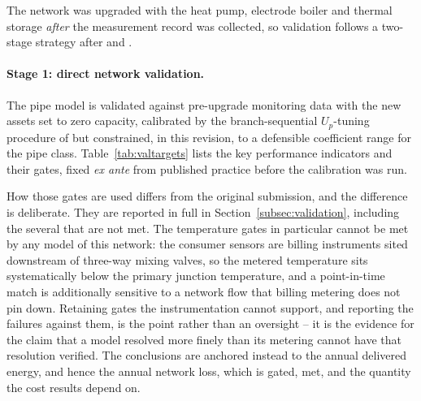 
The network was upgraded with the heat pump, electrode boiler and thermal storage
\emph{after} the measurement record was collected, so validation follows a two-stage
strategy after \citet{Kus2025} and \citet{Maldonado2024}.

\paragraph{Stage 1: direct network validation.}
The pipe model is validated against pre-upgrade monitoring data with the new assets set to
zero capacity, calibrated by the branch-sequential $U_p$-tuning procedure of
\citet{Maldonado2024} but constrained, in this revision, to a defensible coefficient range
for the pipe class. Table~\ref{tab:valtargets} lists the key performance indicators and
their gates, fixed \emph{ex ante} from published practice before the calibration was run.

How those gates are used differs from the original submission, and the difference is
deliberate. They are reported in full in Section~\ref{subsec:validation}, including the
several that are not met. The temperature gates in particular cannot be met by any model of
this network: the consumer sensors are billing instruments sited downstream of three-way
mixing valves, so the metered temperature sits systematically below the primary junction
temperature, and a point-in-time match is additionally sensitive to a network flow that
billing metering does not pin down. Retaining gates the instrumentation cannot support, and
reporting the failures against them, is the point rather than an oversight -- it is the
evidence for the claim that a model resolved more finely than its metering cannot have that
resolution verified. The conclusions are anchored instead to the annual delivered energy,
and hence the annual network loss, which is gated, met, and the quantity the cost results
depend on.

